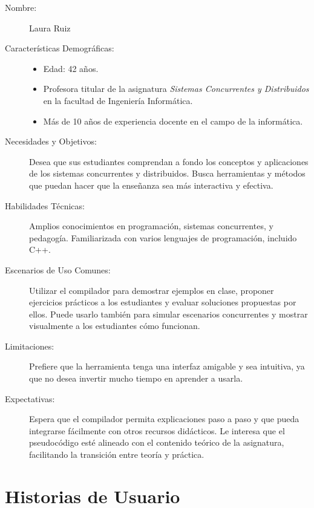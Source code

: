 \begin{description}
    \item[Nombre:] Laura Ruiz
    \item[Características Demográficas:] \hfill
        \begin{itemize}
            \item Edad: 42 años.
            \item Profesora titular de la asignatura \textit{Sistemas Concurrentes y Distribuidos} en la facultad de Ingeniería Informática.
            \item Más de 10 años de experiencia docente en el campo de la informática.
        \end{itemize}
    \item[Necesidades y Objetivos:] Desea que sus estudiantes comprendan a fondo los conceptos y aplicaciones de los sistemas concurrentes y distribuidos. Busca herramientas y métodos que puedan hacer que la enseñanza sea más interactiva y efectiva.
    
    \item[Habilidades Técnicas:] Amplios conocimientos en programación, sistemas concurrentes, y pedagogía. Familiarizada con varios lenguajes de programación, incluido C++.
    
    \item[Escenarios de Uso Comunes:] Utilizar el compilador para demostrar ejemplos en clase, proponer ejercicios prácticos a los estudiantes y evaluar soluciones propuestas por ellos. Puede usarlo también para simular escenarios concurrentes y mostrar visualmente a los estudiantes cómo funcionan.
    
    \item[Limitaciones:] Prefiere que la herramienta tenga una interfaz amigable y sea intuitiva, ya que no desea invertir mucho tiempo en aprender a usarla. 
    
    \item[Expectativas:] Espera que el compilador permita explicaciones paso a paso y que pueda integrarse fácilmente con otros recursos didácticos. Le interesa que el pseudocódigo esté alineado con el contenido teórico de la asignatura, facilitando la transición entre teoría y práctica.
\end{description}

\newpage

\section{Historias de Usuario}


